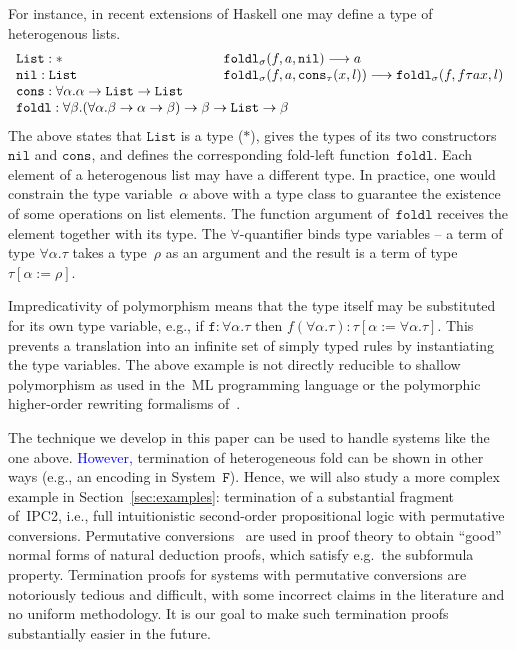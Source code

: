 \documentclass[a4paper,UKenglish,cleveref,autoref,numberwithinsect]{lipics-v2019}
\theoremstyle{definition}
\newcommand{\arrtype}{\rightarrow}
\newcommand{\subst}[2]{#1:=#2}
\newcommand{\red}{\longrightarrow}
\newcommand{\List}{\mathtt{List}}
\newcommand{\nil}{\mathtt{nil}}
\newcommand{\cons}{\mathtt{cons}}
\newcommand{\CKchange}[1]{\textcolor{blue}{#1}}
\begin{document}
For instance, in recent extensions of Haskell one may define a type of
heterogenous lists.
\[
\begin{array}{ll}
  \List : * &
  \mathtt{foldl}_\sigma(f,a,\nil) \red a \\
  \mathtt{nil} : \List &
  \mathtt{foldl}_\sigma(f,a,\cons_\tau(x,l)) \red \mathtt{foldl}_\sigma(f,f \tau a x,l) \\
  \mathtt{cons} : \forall \alpha . \alpha \arrtype \List \arrtype \List \quad\quad \\
  \multicolumn{2}{l}{\mathtt{foldl} : \forall \beta . (\forall \alpha . \beta \arrtype \alpha \arrtype \beta) \arrtype \beta \arrtype \List \arrtype \beta}
\end{array}
\]
The above states that $\List$ is a type ($*$), gives the types of its
two constructors $\nil$ and $\cons$, and defines the corresponding
fold-left function~$\mathtt{foldl}$. Each element of a heterogenous
list may have a different type. In practice, one would
  constrain the type variable~$\alpha$ above with a type class to
  guarantee the existence of some operations on list elements.  The
function argument of~$\mathtt{foldl}$ receives the element together
with its type. The $\forall$-quantifier binds type variables -- a term
of type $\forall \alpha . \tau$ takes a type~$\rho$ as an argument and
the result is a term of type~$\tau[\subst{\alpha}{\rho}]$.
\pagebreak

Impredicativity of polymorphism means that the type itself may be
substituted for its own type variable, e.g., if $\mathtt{f} : \forall
\alpha . \tau$ then $f (\forall \alpha . \tau) :
\tau[\subst{\alpha}{\forall\alpha.\tau}]$. This prevents a translation
into an infinite set of simply typed rules by instantiating the type
variables. The above example is not directly reducible to shallow
polymorphism as used in the~ML programming language or the polymorphic
higher-order rewriting formalisms of~\cite{jou:oka:91,jou:rub:99}.

The technique we develop in this paper can be used to handle
systems like the one above.  \CKchange{However,} termination of heterogeneous
fold can be shown in other ways (e.g., an encoding in
System~$\mathtt{F}$). Hence, we will also study a more complex example
in Section~\ref{sec:examples}: termination of a substantial fragment
of~IPC2, i.e., full intuitionistic second-order propositional logic
with permutative conversions. Permutative
conversions~\cite[Chapter~6]{TroelstraSchwichtenberg1996} are used in
proof theory to obtain ``good'' normal forms of natural deduction
proofs, which satisfy e.g.~the subformula property. Termination proofs
for systems with permutative conversions are notoriously tedious and
difficult, with some incorrect claims in the literature and no uniform
methodology. It is our goal to make such termination proofs
substantially easier in the future.
\end{document}
